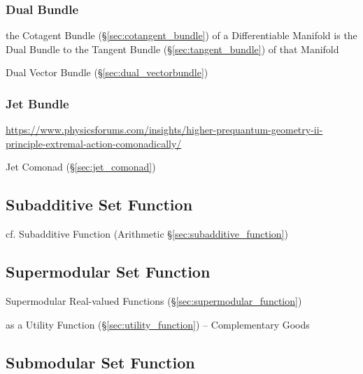 \subsubsection{Dual Bundle}\label{sec:dual_bundle}

the Cotagent Bundle (\S\ref{sec:cotangent_bundle}) of a Differentiable Manifold
is the Dual Bundle to the Tangent Bundle (\S\ref{sec:tangent_bundle}) of that
Manifold

\fist Dual Vector Bundle (\S\ref{sec:dual_vectorbundle})



\subsubsection{Jet Bundle}\label{sec:jet_bundle}

\url{https://www.physicsforums.com/insights/higher-prequantum-geometry-ii-principle-extremal-action-comonadically/}

\fist Jet Comonad (\S\ref{sec:jet_comonad})



\subsection{Subadditive Set Function}\label{sec:subadditive_set_function}

cf. Subadditive Function (Arithmetic \S\ref{sec:subadditive_function})



\subsection{Supermodular Set Function}\label{sec:supermodular_set_function}

\fist Supermodular Real-valued Functions (\S\ref{sec:supermodular_function})

as a Utility Function (\S\ref{sec:utility_function}) -- Complementary Goods



\subsection{Submodular Set Function}\label{sec:submodular_set_function}

